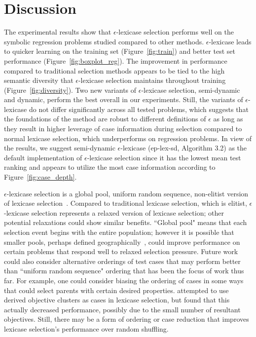 \documentclass[twoside]{article}
\begin{document}
\section{Discussion}\label{s:discuss}
The experimental results show that $\epsilon$-lexicase selection performs well on the symbolic regression problems studied compared to other methods. $\epsilon$-lexicase leads to quicker learning on the training set (Figure~\ref{fig:train}) and better test set performance (Figure~\ref{fig:boxplot_reg}). The improvement in performance compared to traditional selection methods appears to be tied to the high semantic diversity that $\epsilon$-lexicase selection maintains throughout training (Figure~\ref{fig:diversity}). Two new variants of $\epsilon$-lexicase selection, semi-dynamic and dynamic, perform the best overall in our experiments. Still, the variants of $\epsilon$-lexicase do not differ significantly across all tested problems, which suggests that the foundations of the method are robust to different definitions of $\epsilon$ as long as they result in higher leverage of case information during selection compared to normal lexicase selection, which underperforms on regression problems. In view of the results, we suggest semi-dynamic $\epsilon$-lexicase (ep-lex-sd, Algorithm 3.2) as the default implementation of $\epsilon$-lexicase selection since it has the lowest mean test ranking and appears to utilize the most case information according to Figure~\ref{fig:case_depth}. 
 
$\epsilon$-lexicase selection is a global pool, uniform random sequence, non-elitist version of lexicase selection~\citep{spector_assessment_2012}. Compared to traditional lexicase selection, which is elitist, $\epsilon$-lexicase selection represents a relaxed version of lexicase selection; other potential relaxations could show similar benefits. ``Global pool" means that each selection event begins with the entire population; however it is possible that smaller pools, perhaps defined geographically~\citep{spector_trivial_2006}, could improve performance on certain problems that respond well to relaxed selection pressure. Future work could also consider alternative orderings of test cases that may perform better than ``uniform random sequence" ordering that has been the focus of work thus far. For example, one could consider biasing the ordering of cases in some ways that could select parents with certain desired properties. \cite{liskowski_comparison_2015} attempted to use derived objective clusters as cases in lexicase selection, but found that this actually decreased performance, possibly due to the small number of resultant objectives. Still, there may be a form of ordering or case reduction that improves lexicase selection's performance over random shuffling.   
 
\end{document}
